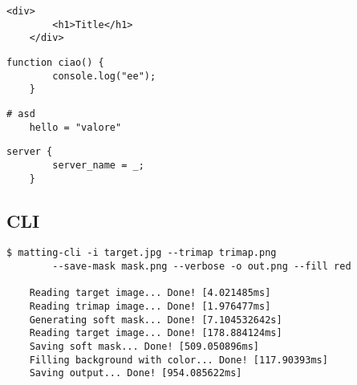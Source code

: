 \documentclass[a4paper]{article}
\begin{document}
\begin{lstlisting}[style=HTML, style=boxed]
    <div>
        <h1>Title</h1>
    </div>
\end{lstlisting}

\begin{lstlisting}[style=JS, style=boxed]
    function ciao() {
        console.log("ee");
    }
\end{lstlisting}

\begin{lstlisting}[style=TOML, style=boxed]
    # asd
    hello = "valore"
\end{lstlisting}

\begin{lstlisting}[style=nginx, style=boxed]
    server {
        server_name = _;
    }
\end{lstlisting}

\subsection{CLI}

\hr

\begin{lstlisting}[style=boxed]
    $ matting-cli -i target.jpg --trimap trimap.png
        --save-mask mask.png --verbose -o out.png --fill red
    
    Reading target image... Done! [4.021485ms]
    Reading trimap image... Done! [1.976477ms]
    Generating soft mask... Done! [7.104532642s]
    Reading target image... Done! [178.884124ms]
    Saving soft mask... Done! [509.050896ms]
    Filling background with color... Done! [117.90393ms]
    Saving output... Done! [954.085622ms]
\end{lstlisting}

\pagebreak

\listoffigures

\pagebreak

\nocite{*} %

\printbibliography
\end{document}
